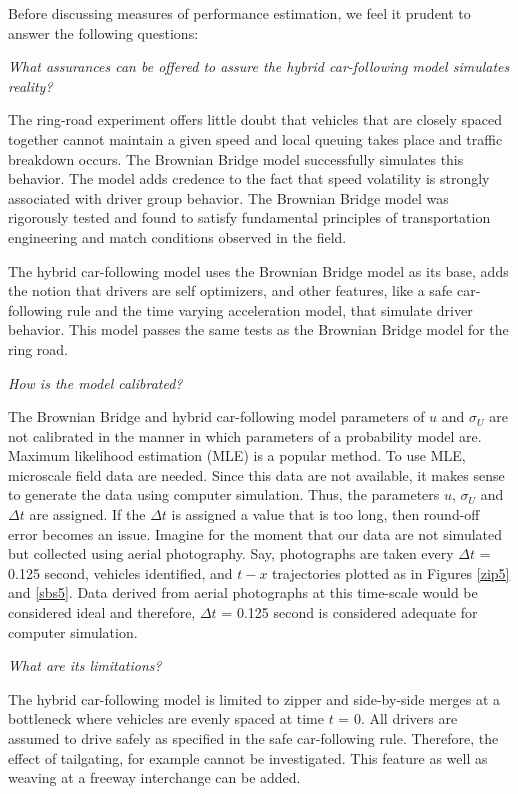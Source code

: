 \documentclass[Proceedings]{ascelike}
\begin{document}
Before discussing  measures of performance estimation, we feel it prudent to answer the following questions: 

\noindent \emph{What assurances can be offered to assure the hybrid car-following model simulates reality? }

 The ring-road experiment offers little doubt that vehicles that are closely spaced together cannot maintain a given speed and local queuing takes place and traffic breakdown occurs. The Brownian Bridge model successfully simulates this behavior. The model adds credence to the fact that speed volatility is strongly associated with driver group behavior. The Brownian Bridge model was  rigorously tested and found to satisfy fundamental principles of transportation engineering and match conditions observed in the field. 
 
 The hybrid car-following model uses the Brownian Bridge model as its base, adds the notion that drivers are self optimizers, and other features, like a safe car-following rule and the time varying acceleration model, that simulate driver behavior. This model  passes the same tests as the Brownian Bridge model for the ring road.

\noindent \emph{How is the model calibrated? } 

The Brownian Bridge and hybrid car-following model parameters of $u$ and $\sigma_U$ are not calibrated in the manner in which parameters of a probability model are. Maximum likelihood estimation (MLE) is a popular method. To use MLE, microscale field data are needed. Since this data are not available, it makes sense to generate the data using computer simulation. Thus, the parameters $u$, $\sigma_U$ and $\Delta t$ are assigned.  If the $\Delta t$ is assigned a value that is too long, then round-off error becomes an issue. Imagine for the moment that our data are not simulated but collected using aerial photography. Say, photographs are taken every  $\Delta t$ = 0.125 second,  vehicles identified, and $t-x$ trajectories plotted as in Figures \ref{zip5} and \ref{sbs5}. Data derived from aerial photographs at this time-scale would be considered ideal and therefore, $\Delta t$ = 0.125 second is considered adequate for computer simulation.

\noindent \emph{What are its limitations?} 

The hybrid car-following model is limited to zipper and side-by-side merges at a bottleneck where vehicles are  evenly spaced at time $t$ = 0. All drivers are assumed to drive safely as specified in the safe car-following rule. Therefore, the effect of tailgating, for example cannot be investigated. This feature as well as  weaving at a freeway interchange can be added. 
\end{document}
